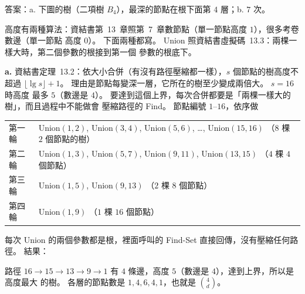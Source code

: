 \begin{pastsoln}
答案：a. 下圖的樹（二項樹 $B_4$），最深的節點在根下面第 $4$ 層；b. $7$ 次。

高度有兩種算法：資結書第~13~章照第~7~章數節點（單一節點高度 $1$），很多考卷數邊（單一節點
高度 $0$）。 下面兩種都寫。 Union 照資結書虛擬碼~13.3：兩棵一樣大時，第二個參數的根接到第一個
參數的根底下。

\textbf{a.} 資結書定理~13.2：依大小合併（有沒有路徑壓縮都一樣），$s$ 個節點的樹高度不超過
$\lfloor \lg s \rfloor + 1$。 理由是節點每變深一層，它所在的樹至少變成兩倍大。 $s = 16$ 時高度
最多 $5$（數邊是 $4$）。 要達到這個上界，每次合併都要是「兩棵一樣大的樹」，而且過程中不能做會
壓縮路徑的 Find。 節點編號 $1$--$16$，依序做
\begin{center}
\begin{tabular}{ll}
\toprule
第一輪 & Union$(1, 2)$, Union$(3, 4)$, Union$(5, 6)$, \ldots, Union$(15, 16)$ \quad（$8$ 棵 $2$ 個節點的樹） \\
第二輪 & Union$(1, 3)$, Union$(5, 7)$, Union$(9, 11)$, Union$(13, 15)$ \quad（$4$ 棵 $4$ 個節點） \\
第三輪 & Union$(1, 5)$, Union$(9, 13)$ \quad（$2$ 棵 $8$ 個節點） \\
第四輪 & Union$(1, 9)$ \quad（$1$ 棵 $16$ 個節點） \\
\bottomrule
\end{tabular}
\end{center}
每次 Union 的兩個參數都是根，裡面呼叫的 Find-Set 直接回傳，沒有壓縮任何路徑。 結果：
\begin{center}
\end{center}
路徑 $16 \to 15 \to 13 \to 9 \to 1$ 有 $4$ 條邊，高度 $5$（數邊是 $4$），達到上界，所以是高度最大
的樹。 各層的節點數是 $1, 4, 6, 4, 1$，也就是 $\binom{4}{d}$。


\end{pastsoln}
